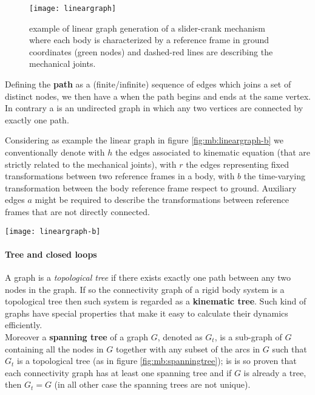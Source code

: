 	\begin{figure}[bht]
		\centering \texttt{[image: lineargraph]}
		\caption{example of linear graph generation of a slider-crank mechanism where each body is characterized by a reference frame in ground coordinates (green nodes) and dashed-red lines are describing the mechanical joints.}
		\label{fig:mb:lineargraph}
	\end{figure}
	
	Defining the \textbf{path} as a (finite/infinite) sequence of edges which joins a set of distinct nodes, we then have a  when the path begins and ends at the same vertex. In contrary a  is an undirected graph in which any two vertices are connected by exactly one path.
	
	Considering as example the linear graph in figure \ref{fig:mb:lineargraph-b} we conventionally denote with $h$ the edges associated to kinematic equation (that are strictly related to the mechanical joints), with $r$ the edges representing fixed transformations between two reference frames in a body, with $b$ the time-varying transformation between the body reference frame respect to ground. Auxiliary edges $a$ might be required to describe the transformations between reference frames that are not directly connected.
	
	\begin{SCfigure}[2][bht]
		\centering \texttt{[image: lineargraph-b]}
		\caption{linear graph of the slider-crank mechanism of figure \ref{fig:mb:lineargraph}.} \label{fig:mb:lineargraph-b}
	\end{SCfigure}
	
	\paragraph{Tree and closed loops} A graph is a \textit{topological tree} if there exists exactly one path between any two nodes in the graph. If so the connectivity graph of a rigid body system is a topological tree then such system is regarded as a \textbf{kinematic tree}. Such kind of graphs have special properties that make it easy to calculate their dynamics efficiently.\\
	Moreover a \textbf{spanning tree} of a graph $G$, denoted as $G_t$, is a sub-graph of $G$ containing all the nodes in $G$ together with any subset of the arcs in $G$ such that $G_t$ is a topological tree (as in figure \ref{fig:mb:spanningtree}); is is so proven that each connectivity graph has at least one spanning tree and if $G$ is already a tree, then $G_t = G$ (in all other case the spanning trees are not unique).
	
